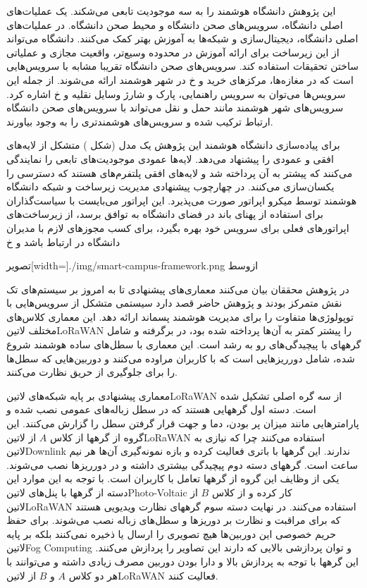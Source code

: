 این پژوهش دانشگاه هوشمند را به سه موجودیت تابعی می‌شکند. یک عملیات‌های اصلی دانشگاه، سرویس‌های صحن دانشگاه و محیط صحن دانشگاه.
در عملیات‌های اصلی دانشگاه، دیجیتال‌سازی و شبکه‌ها به آموزش بهتر کمک می‌کنند. دانشگاه می‌تواند از این زیرساخت برای ارائه آموزش در محدوده وسیع‌تر، واقعیت مجازی و عملیاتی ساختن تحقیقات استفاده کند.
سرویس‌های صحن دانشگاه تقریبا مشابه با سرویس‌هایی است که در مغازه‌ها، مرکزهای خرید و ‌خ در شهر هوشمند ارائه می‌شوند. از جمله این سرویس‌ها می‌توان به سرویس راهنمایی، پارک و شارژ وسایل نقلیه و ‌خ اشاره کرد.
سرویس‌های شهر هوشمند مانند حمل و نقل می‌تواند با سرویس‌های صحن دانشگاه ارتباط ترکیب شده و سرویس‌های هوشمند‌تری را به وجود بیاورند.

برای پیاده‌سازی دانشگاه هوشمند این پژوهش یک مدل (شکل ) متشکل از لایه‌های افقی و عمودی را پیشنهاد می‌دهد. لایه‌ها عمودی موجودیت‌های تابعی را نمایندگی می‌کنند که پیشتر به آن پرداخته شد و لایه‌های
افقی پلتفرم‌های هستند که دسترسی را یکسان‌سازی می‌کنند. در چهارچوب پیشنهادی مدیریت زیرساخت و شبکه دانشگاه هوشمند توسط میکرو اپراتور صورت می‌پذیرد. این اپراتور می‌بایست با سیاست‌گذاران برای استفاده از پهنای باند در فضای دانشگاه
به توافق برسد، از زیرساخت‌های اپراتورهای فعلی برای سرویس خود بهره بگیرد، برای کسب مجوزهای لازم با مدیران دانشگاه در ارتباط باشد و ‌خ

‌تصویر[width=\textwidth]{./img/smart-campus-framework.png}
‌ازوسط


در پژوهش  محققان بیان می‌کنند معماری‌های پیشنهادی تا به امروز بر سیستم‌های تک نقش متمرکز بودند و پژوهش حاضر قصد دارد سیستمی متشکل از سرویس‌هایی با توپولوژی‌ها متفاوت را
برای مدیریت هوشمند پسماند ارائه دهد. این معماری کلاس‌های مختلف ‌لاتین{LoRaWAN} را پیشتر کمتر به آن‌ها پرداخته شده بود، در برگرفته و شامل گرههای با پیچیدگی‌های رو به رشد است.
این معماری با سطل‌های ساده هوشمند شروع شده، شامل دورریزهایی است که با کاربران مراوده می‌کنند و دوربین‌هایی که سطل‌ها را برای جلوگیری از حریق نظارت می‌کنند.

معماری پیشنهادی بر پایه شبکه‌های ‌لاتین{LoRaWAN} از سه گره اصلی تشکیل شده است.
دسته اول گرههایی هستند که در سطل زباله‌های عمومی نصب شده و پارامترهایی مانند
میزان پر بودن، دما و جهت قرار گرفتن سطل را گزارش می‌کنند. این گروه از گرهها از کلاس $A$ از ‌لاتین{LoRaWAN} استفاده می‌کنند چرا که نیازی به ‌لاتین{Downlink} ندارند.
این گرهها با باتری فعالیت کرده و بازه نمونه‌گیری آن‌ها هر نیم ساعت است.
گرههای دسته دوم پیچیدگی بیشتری داشته و در دورریزها نصب می‌شوند. یکی از وظایف این گروه از گرهها تعامل با کاربران است.
با توجه به این موارد این دسته از گرهها با پنل‌های ‌لاتین{Photo-Voltaic} کار کرده و
از کلاس $B$ از ‌لاتین{LoRaWAN} استفاده می‌کنند.
در نهایت دسته سوم گرههای نظارت ویدیویی هستند که برای مراقبت و نظارت بر دوریزها و سطل‌های زباله نصب می‌شوند. برای حفظ حریم خصوصی این دوربین‌ها هیچ تصویری را ارسال یا ذخیره نمی‌کنند
بلکه بر پایه ‌لاتین{Fog Computing} و توان پردازشی بالایی که دارند این تصاویر را پردازش می‌کنند.
این گرهها با توجه به پردازش بالا و دارا بودن دوربین مصرف زیادی داشته و می‌توانند با هر دو کلاس $A$ و $B$ از ‌لاتین{LoRaWAN} فعالیت کنند.

